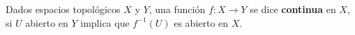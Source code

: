

\begin{definition}
Dados espacios topológicos $X$ y $Y$, una función $f : X \longrightarrow Y$ se dice \textbf{continua} en $X$, si $U$ abierto en $Y$ implica que $f^{-1}(U)$ es abierto en $X$.
\end{definition}
